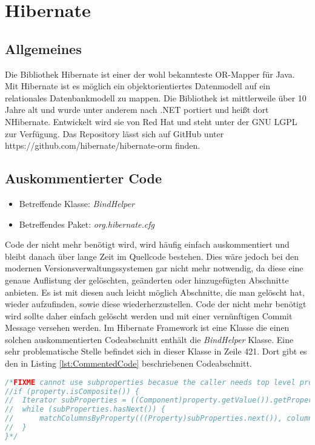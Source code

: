 
\section{Hibernate}
\subsection{Allgemeines}
Die Bibliothek Hibernate ist einer der wohl bekannteste OR-Mapper für Java. Mit Hibernate ist es möglich ein objektorientiertes Datenmodell  auf ein relationales Datenbankmodell zu mappen. Die Bibliothek ist mittlerweile über 10 Jahre alt und wurde unter anderem nach .NET portiert und heißt dort NHibernate. Entwickelt wird sie von Red Hat und steht unter der GNU LGPL zur Verfügung. Das Repository lässt sich auf GitHub unter https://github.com/hibernate/hibernate-orm finden.

\subsection{Auskommentierter Code}
\begin{itemize}
	\item Betreffende Klasse: \textit{BindHelper}
	\item Betreffendes Paket: \textit{org.hibernate.cfg}
\end{itemize}


\SuperPar Code der nicht mehr benötigt wird, wird häufig einfach auskommentiert und bleibt danach über lange Zeit im Quellcode bestehen. Dies wäre jedoch bei den modernen Versionsverwaltungssystemen gar nicht mehr notwendig, da diese eine genaue Auflistung der gelöschten, geänderten oder hinzugefügten Abschnitte anbieten. Es ist mit diesen auch leicht möglich Abschnitte, die man gelöscht hat, wieder aufzufinden, sowie diese wiederherzustellen. Code der nicht mehr benötigt wird sollte daher einfach gelöscht werden und mit einer vernünftigen Commit Message versehen werden. Im Hibernate Framework ist eine Klasse die einen solchen auskommentierten Codeabschnitt enthält die \textit{BindHelper} Klasse. Eine sehr problematische Stelle befindet sich in dieser Klasse in Zeile 421. Dort gibt es den in Listing \ref{lst:CommentedCode} beschriebenen Codeabschnitt.

\begin{lstlisting}[language=Java, caption=Beispiele für die Verwendung von \textit{GetByPredicate}, label=lst:CommentedCode]
/*FIXME cannot use subproperties becasue the caller needs top level properties
//if (property.isComposite()) {
//	Iterator subProperties = ((Component)property.getValue()).getPropertyIterator();
// 	while (subProperties.hasNext()) {
//  	matchColumnsByProperty(((Property)subProperties.next()), columnsToProperty);
// 	}
}*/ 
\end{lstlisting}

